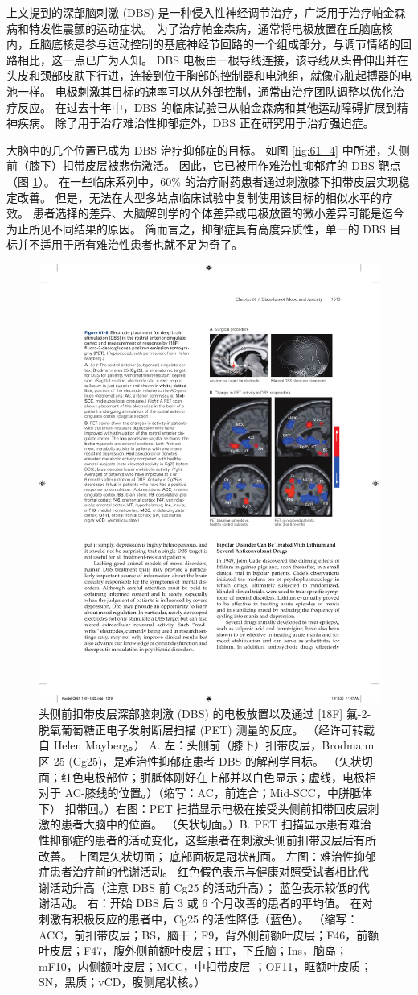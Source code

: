 上文提到的深部脑刺激 (DBS) 是一种侵入性神经调节治疗，广泛用于治疗帕金森病和特发性震颤的运动症状。 为了治疗帕金森病，通常将电极放置在丘脑底核内，丘脑底核是参与运动控制的基底神经节回路的一个组成部分，与调节情绪的回路相比，这一点已广为人知。 DBS 电极由一根导线连接，该导线从头骨伸出并在头皮和颈部皮肤下行进，连接到位于胸部的控制器和电池组，就像心脏起搏器的电池一样。 电极刺激其目标的速率可以从外部控制，通常由治疗团队调整以优化治疗反应。 在过去十年中，DBS 的临床试验已从帕金森病和其他运动障碍扩展到精神疾病。 除了用于治疗难治性抑郁症外，DBS 正在研究用于治疗强迫症。

大脑中的几个位置已成为 DBS 治疗抑郁症的目标。 如图 \ref{fig:61_4} 中所述，头侧前（膝下）扣带皮层被悲伤激活。 因此，它已被用作难治性抑郁症的 DBS 靶点（图 \ref{fig:61_8}）。 在一些临床系列中，60\% 的治疗耐药患者通过刺激膝下扣带皮层实现稳定改善。 但是，无法在大型多站点临床试验中复制使用该目标的相似水平的疗效。 患者选择的差异、大脑解剖学的个体差异或电极放置的微小差异可能是迄今为止所见不同结果的原因。 简而言之，抑郁症具有高度异质性，单一的 DBS 目标并不适用于所有难治性患者也就不足为奇了。

\begin{figure}[htbp]
	\centering
	\includegraphics[width=0.6\linewidth]{chap61/fig_61_8}
	\caption{头侧前扣带皮层深部脑刺激 (DBS) 的电极放置以及通过 [18F] 氟-2-脱氧葡萄糖正电子发射断层扫描 (PET) 测量的反应。 （经许可转载自 Helen Mayberg。） A. 左：头侧前（膝下）扣带皮层，Brodmann 区 25 (Cg25)，是难治性抑郁症患者 DBS 的解剖学目标。 （矢状切面；红色电极部位；胼胝体刚好在上部并以白色显示；虚线，电极相对于 AC-膝线的位置。）（缩写：AC，前连合；Mid-SCC，中胼胝体下） 扣带回。）右图：PET 扫描显示电极在接受头侧前扣带回皮层刺激的患者大脑中的位置。 （矢状切面。）B. PET 扫描显示患有难治性抑郁症的患者的活动变化，这些患者在刺激头侧前扣带皮层后有所改善。 上图是矢状切面； 底部面板是冠状剖面。 左图：难治性抑郁症患者治疗前的代谢活动。 红色假色表示与健康对照受试者相比代谢活动升高（注意 DBS 前 Cg25 的活动升高）； 蓝色表示较低的代谢活动。 右：开始 DBS 后 3 或 6 个月改善的患者的平均值。 在对刺激有积极反应的患者中，Cg25 的活性降低（蓝色）。 （缩写：ACC，前扣带皮层；BS，脑干；F9，背外侧前额叶皮层；F46，前额叶皮层；F47，腹外侧前额叶皮层；HT，下丘脑；Ins，脑岛；mF10，内侧额叶皮层；MCC，中扣带皮层 ；OF11，眶额叶皮质；SN，黑质；vCD，腹侧尾状核。）}
	\label{fig:61_8}
\end{figure}

